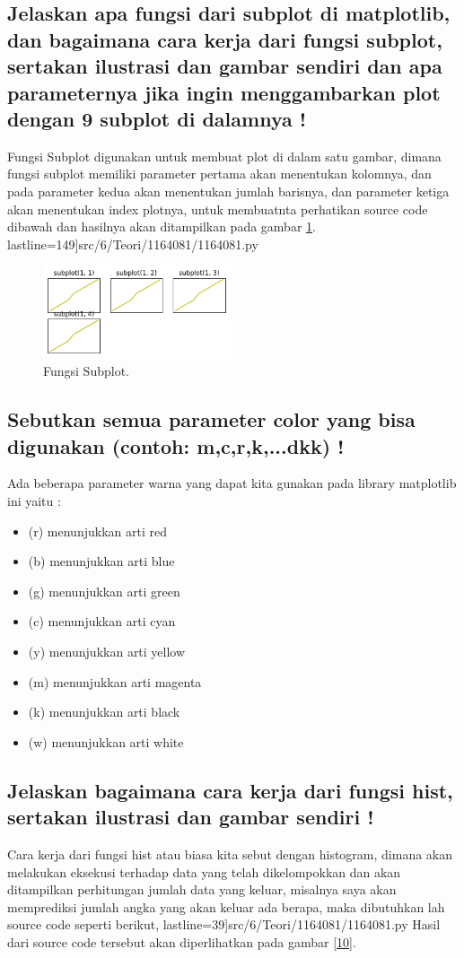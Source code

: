 \subsection{Jelaskan apa fungsi dari subplot di matplotlib, dan bagaimana cara kerja dari fungsi subplot, sertakan ilustrasi dan gambar sendiri dan apa parameternya jika ingin menggambarkan plot dengan 9 subplot di dalamnya !}
 Fungsi Subplot digunakan untuk membuat plot di dalam satu gambar, dimana fungsi subplot memiliki parameter pertama akan menentukan kolomnya, dan pada parameter kedua akan menentukan jumlah barisnya, dan parameter ketiga akan menentukan index plotnya, untuk membuatnta perhatikan source code dibawah dan hasilnya akan ditampilkan pada gambar \ref{9}.
 lastline=149]{src/6/Teori/1164081/1164081.py}
	\begin{figure}[!htbp!]
		\centerline{\includegraphics[width=0.5\textwidth]{figures/6/Teori/1164081/1164081_9.png}}
		\caption{Fungsi Subplot.}
		\label{9}
	\end{figure}
\subsection{Sebutkan semua parameter color yang bisa digunakan (contoh: m,c,r,k,...dkk) !}
Ada beberapa parameter warna yang dapat kita gunakan pada library matplotlib ini yaitu :
	\begin{itemize}
		\item (r) menunjukkan arti red
		\item (b) menunjukkan arti blue
		\item (g) menunjukkan arti green
		\item (c) menunjukkan arti cyan
		\item (y) menunjukkan arti yellow
		\item (m) menunjukkan arti magenta
		\item (k) menunjukkan arti black
		\item (w) menunjukkan arti white
	\end{itemize}
\subsection{Jelaskan bagaimana cara kerja dari fungsi hist, sertakan ilustrasi dan gambar sendiri !}
Cara kerja dari fungsi hist atau biasa kita sebut dengan histogram, dimana akan melakukan eksekusi terhadap data yang telah dikelompokkan dan akan ditampilkan perhitungan jumlah data yang keluar, misalnya saya akan memprediksi jumlah angka yang akan keluar ada berapa, maka dibutuhkan lah source code seperti berikut,
	 lastline=39]{src/6/Teori/1164081/1164081.py}
Hasil dari source code tersebut akan diperlihatkan pada gambar \ref{10}.

